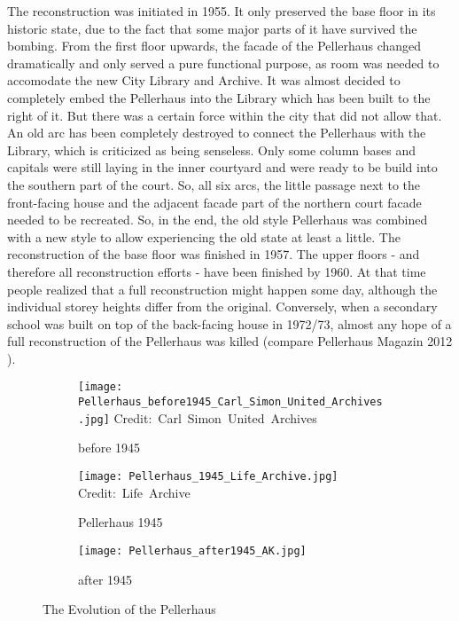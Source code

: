 The reconstruction was initiated in 1955. It only preserved the base floor in its historic state, due to the fact that some major parts of it have survived the bombing. From the first floor upwards, the facade of the Pellerhaus changed dramatically and only served a pure functional purpose, as room was needed to accomodate the new City Library and Archive. It was almost decided to completely embed the Pellerhaus into the Library which has been built to the right of it. But there was a certain force within the city that did not allow that. An old arc has been completely destroyed to connect the Pellerhaus with the Library, which is criticized as being senseless. Only some column bases and capitals were still laying in the inner courtyard and were ready to be build into the southern part of the court. So, all six arcs, the little passage next to the front-facing house and the adjacent facade part of the northern court facade needed to be recreated. So, in the end, the old style Pellerhaus was combined with a new style to allow experiencing the old state at least a little. The reconstruction of the base floor was finished in 1957. The upper floors - and therefore all reconstruction efforts - have been finished by 1960. At that time people realized that a full reconstruction might happen some day, although the individual storey heights differ from the original. Conversely, when a secondary school was built on top of the back-facing house in 1972/73, almost any hope of a full reconstruction of the Pellerhaus was killed (compare Pellerhaus Magazin 2012 \parencite{afPellerhausMagazin01}). \\


\begin{figure}[h]
	\centering
	\begin{subfigure}[b]{0.3\textwidth}
		\centering
		\texttt{[image: Pellerhaus\_before1945\_Carl\_Simon\_United\_Archives.jpg]}
		\hbox{\scriptsize Credit: Carl Simon United Archives}
		\caption{before 1945}
		\label{fig:pellerhaus_historic}
	\end{subfigure}
	\hfill
	\begin{subfigure}[b]{0.3\textwidth}
		\centering
		\texttt{[image: Pellerhaus\_1945\_Life\_Archive.jpg]}
		\hbox{\scriptsize Credit: Life Archive}
		\caption{Pellerhaus 1945}
		\label{fig:pellerhaus_destructed}
	\end{subfigure}
	\hfill
	\begin{subfigure}[b]{0.3\textwidth}
		\centering
		\texttt{[image: Pellerhaus\_after1945\_AK.jpg]}
		\hbox{\scriptsize }
		\caption{after 1945}
		\label{fig:pellerhaus_modern}
	\end{subfigure}
	\caption{The Evolution of the Pellerhaus}
	\label{fig:pellerhaus_states}
\end{figure}

